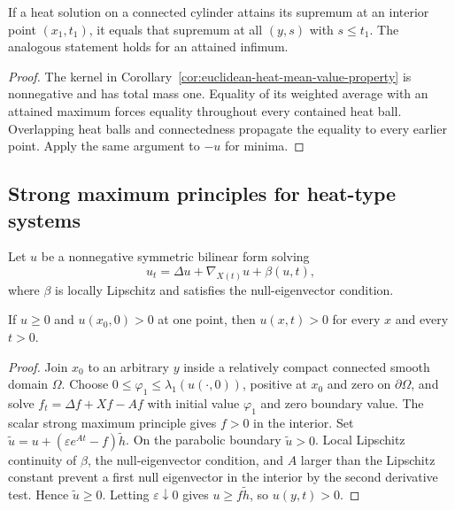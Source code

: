 \begin{corollary}
\label{cor:heat-mean-value-strong-maximum-principle}
If a heat solution on a connected cylinder attains its supremum at an
interior point $(x_1,t_1)$, it equals that supremum at all $(y,s)$ with
$s\leq t_1$.  The analogous statement holds for an attained infimum.
\end{corollary}

\begin{proof}
\sketch
The kernel in Corollary~\ref{cor:euclidean-heat-mean-value-property} is
nonnegative and has total mass one.  Equality of its weighted average with an
attained maximum forces equality throughout every contained heat ball.
Overlapping heat balls and connectedness propagate the equality to every
earlier point.  Apply the same argument to $-u$ for minima.
\end{proof}

\subsection{Strong maximum principles for heat-type systems}

Let $u$ be a nonnegative symmetric bilinear form solving
\[
u_t=\Delta u+\nabla_{X(t)}u+\beta(u,t),
\]
where $\beta$ is locally Lipschitz and satisfies the null-eigenvector
condition.

\begin{proposition}
\label{prop:system-strong-maximum-principle-positive-definite}
If $u\geq0$ and $u(x_0,0)>0$ at one point, then
$u(x,t)>0$ for every $x$ and every $t>0$.
\end{proposition}

\begin{proof}
\sketch
{}
Join $x_0$ to an arbitrary $y$ inside a relatively compact connected smooth
domain $\Omega$.  Choose $0\leq\varphi_1\leq\lambda_1(u(\cdot,0))$, positive
at $x_0$ and zero on $\partial\Omega$, and solve
$f_t=\Delta f+Xf-Af$ with initial value $\varphi_1$ and zero boundary value.
The scalar strong maximum principle gives $f>0$ in the interior.  Set
$\widetilde u=u+(\varepsilon e^{At}-f)\widetilde h$.  On the parabolic
boundary $\widetilde u>0$.  Local Lipschitz continuity of $\beta$, the
null-eigenvector condition, and $A$ larger than the Lipschitz constant prevent
a first null eigenvector in the interior by the second derivative test.
Hence $\widetilde u\geq0$.  Letting $\varepsilon\downarrow0$ gives
$u\geq f\widetilde h$, so $u(y,t)>0$.
\end{proof}

